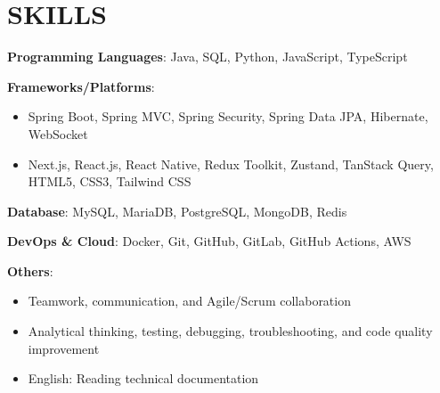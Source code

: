 \section{SKILLS}
\resumeSubHeadingListStart

  \item
    \resumeItemListStart
      \item \textbf{Programming Languages}: Java, SQL, Python, JavaScript, TypeScript
      \item \textbf{Frameworks/Platforms}:
        \begin{itemize}
          \item Spring Boot, Spring MVC, Spring Security, Spring Data JPA, Hibernate, WebSocket
          \item Next.js, React.js, React Native, Redux Toolkit, Zustand, TanStack Query, HTML5, CSS3, Tailwind CSS
        \end{itemize}
      \item \textbf{Database}: MySQL, MariaDB, PostgreSQL, MongoDB, Redis
      \item \textbf{DevOps \& Cloud}: Docker, Git, GitHub, GitLab, GitHub Actions, AWS
      \item \textbf{Others}:
        \begin{itemize}
          \item Teamwork, communication, and Agile/Scrum collaboration
          \item Analytical thinking, testing, debugging, troubleshooting, and code quality improvement
          \item English: Reading technical documentation
        \end{itemize}
    \resumeItemListEnd

\resumeSubHeadingListEnd
